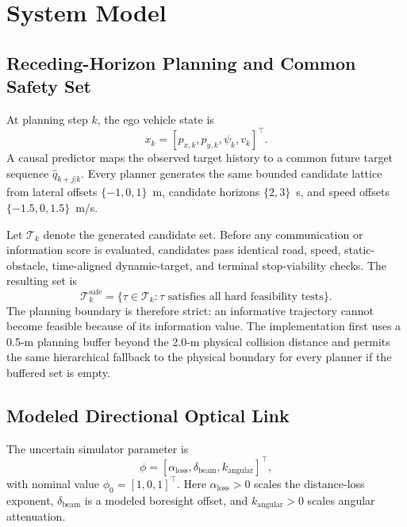 \documentclass[journal]{IEEEtran}
\begin{document}
\section{System Model}
\subsection{Receding-Horizon Planning and Common Safety Set}
At planning step $k$, the ego vehicle state is
\begin{equation}
x_k=[p_{x,k},p_{y,k},\psi_k,v_k]^\top .
\end{equation}
A causal predictor maps the observed target history to a common future target sequence $\hat q_{k+j|k}$. Every planner generates the same bounded candidate lattice from lateral offsets $\{-1,0,1\}$~m, candidate horizons $\{2,3\}$~s, and speed offsets $\{-1.5,0,1.5\}$~m/s.

Let $\mathcal{T}_k$ denote the generated candidate set. Before any communication or information score is evaluated, candidates pass identical road, speed, static-obstacle, time-aligned dynamic-target, and terminal stop-viability checks. The resulting set is
\begin{equation}
\mathcal{T}^{\mathrm{safe}}_k
=
\{\tau\in\mathcal{T}_k:\tau \text{ satisfies all hard feasibility tests}\}.
\end{equation}
The planning boundary is therefore strict: an informative trajectory cannot become feasible because of its information value. The implementation first uses a 0.5-m planning buffer beyond the 2.0-m physical collision distance and permits the same hierarchical fallback to the physical boundary for every planner if the buffered set is empty.

\subsection{Modeled Directional Optical Link}
The uncertain simulator parameter is
\begin{equation}
\phi=[\alpha_{\mathrm{loss}},\delta_{\mathrm{beam}},k_{\mathrm{angular}}]^\top ,
\end{equation}
with nominal value $\phi_0=[1,0,1]^\top$. Here $\alpha_{\mathrm{loss}}>0$ scales the distance-loss exponent, $\delta_{\mathrm{beam}}$ is a modeled boresight offset, and $k_{\mathrm{angular}}>0$ scales angular attenuation.
\end{document}
